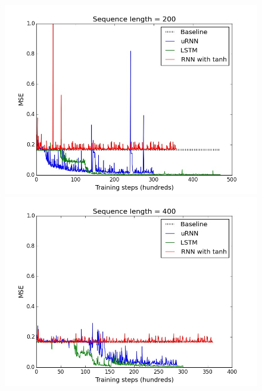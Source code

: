 \documentclass{article} %
\begin{document}
\begin{figure}[ht] 
  \label{ fig7} 
  \begin{minipage}[b]{0.5\linewidth}
    \centering
    \includegraphics[scale=0.25]{figures/adding_200.jpeg}
    \vspace{4ex}
  \end{minipage}%
  \begin{minipage}[b]{0.5\linewidth}
    \centering
    \includegraphics[scale=0.25]{figures/adding_400.jpeg}
    \vspace{4ex}
    \end{minipage} 
  \begin{minipage}[b]{0.5\linewidth}
    \centering

\end{minipage}
\end{figure}
\end{document}
